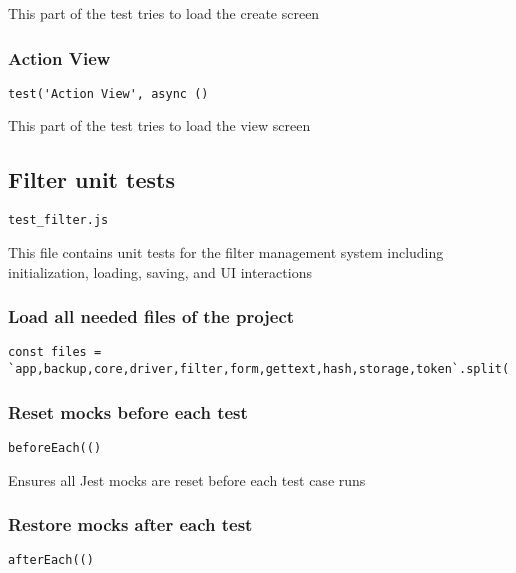 \documentclass[a4paper]{article}
\begin{document}
This part of the test tries to load the create screen

\hypertarget{toc143}{}
\subsubsection{Action View}

\begin{lstlisting}
test('Action View', async ()
\end{lstlisting}

This part of the test tries to load the view screen

\hypertarget{toc144}{}
\subsection{Filter unit tests}

\begin{lstlisting}
test_filter.js
\end{lstlisting}

This file contains unit tests for the filter management system
including initialization, loading, saving, and UI interactions

\hypertarget{toc145}{}
\subsubsection{Load all needed files of the project}

\begin{lstlisting}
const files = `app,backup,core,driver,filter,form,gettext,hash,storage,token`.split(',');
\end{lstlisting}

\hypertarget{toc146}{}
\subsubsection{Reset mocks before each test}

\begin{lstlisting}
beforeEach(()
\end{lstlisting}

Ensures all Jest mocks are reset before each test case runs

\hypertarget{toc147}{}
\subsubsection{Restore mocks after each test}

\begin{lstlisting}
afterEach(()
\end{lstlisting}
\end{document}
